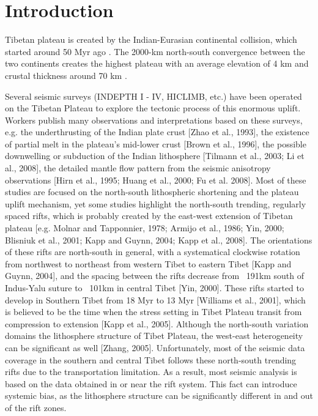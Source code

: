 \section{Introduction}

Tibetan plateau is created by the Indian-Eurasian continental collision, which started around 50 Myr ago \cite{Patriat_1984}. The 2000-km north-south convergence between the two continents creates the highest plateau with an average elevation of 4 km and crustal thickness around 70 km \cite[e.g.][]{Nabelek_2009}.



Several seismic surveys (INDEPTH I - IV, HICLIMB, etc.) have been operated on the Tibetan Plateau to explore the tectonic process of this enormous uplift. Workers publish many observations and interpretations based on these surveys, e.g. the underthrusting of the Indian plate crust [Zhao et al., 1993], the existence of partial melt in the plateau’s mid-lower crust [Brown et al., 1996], the possible downwelling or subduction of the Indian lithosphere [Tilmann et al., 2003; Li et al., 2008], the detailed mantle flow pattern from the seismic anisotropy observations [Hirn et al., 1995; Huang et al., 2000; Fu et al. 2008].
Most of these studies are focused on the north-south lithospheric shortening and the plateau uplift mechanism, yet some studies highlight the north-south trending, regularly spaced rifts, which is probably created by the east-west extension of Tibetan plateau [e.g. Molnar and Tapponnier, 1978; Armijo et al., 1986; Yin, 2000; Blisniuk et al., 2001; Kapp and Guynn, 2004; Kapp et al., 2008]. The orientations of these rifts are north-south in general, with a systematical clockwise rotation from northwest to northeast from western Tibet to eastern Tibet [Kapp and Guynn, 2004], and the spacing between the rifts decrease from ~191km south of Indus-Yalu suture to ~101km in central Tibet [Yin, 2000]. These rifts started to develop in Southern Tibet from 18 Myr to 13 Myr [Williams et al., 2001], which is believed to be the time when the stress setting in Tibet Plateau transit from compression to extension [Kapp et al., 2005]. 
Although the north-south variation domains the lithosphere structure of Tibet Plateau, the west-east heterogeneity can be significant as well [Zhang, 2005]. Unfortunately, most of the seismic data coverage in the southern and central Tibet follows these north-south trending rifts due to the transportation limitation. As a result, most seismic analysis is based on the data obtained in or near the rift system. This fact can introduce systemic bias, as the lithosphere structure can be significantly different in and out of the rift zones.
